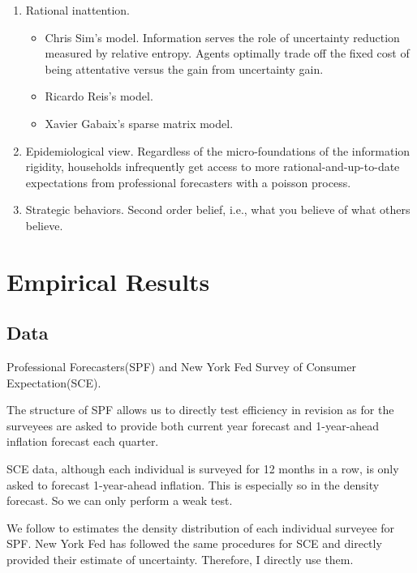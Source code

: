 \documentclass[]{article}
\begin{document}
	\begin{enumerate}
		\item Rational inattention. 
		\begin{itemize}
			\item Chris Sim's model.\citet{sims2003implications} Information serves the role of uncertainty reduction measured by relative entropy. Agents optimally trade off the fixed cost of being attentative versus the gain from uncertainty gain.   
			\item Ricardo Reis's model. \citet{reis2006inattentive}
			\item Xavier Gabaix's sparse matrix model. \citet{gabaix2014sparsity}
		\end{itemize}
		
		\item Epidemiological view. \citet{carroll2003macroeconomic} Regardless of the micro-foundations of the information rigidity, households infrequently get access to more rational-and-up-to-date expectations from professional forecasters with a poisson process. 
		
		
		\item Strategic behaviors. Second order belief, i.e., what you believe of what others believe. \citet{angeletos2009incomplete}
		
		
		
	\end{enumerate}
	
	\section{Empirical Results}\label{empirical}
	
	\subsection{Data}
	
	
	Professional Forecasters(SPF) and New York Fed Survey of Consumer Expectation(SCE). 
	
	The structure of SPF allows us to directly test efficiency in revision as for the surveyees are asked to provide both current year forecast and 1-year-ahead inflation forecast each quarter. 
	
	SCE data, although each individual is surveyed for 12 months in a row, is only asked to forecast 1-year-ahead inflation. This is especially so in the density forecast. So we can only perform a weak test. 
	
	We follow \citet{engelberg2009comparing} to estimates the density distribution of each individual surveyee for SPF. New York Fed has followed the same procedures for SCE and directly provided their estimate of uncertainty. Therefore, I directly use them. 
	
\end{document}
